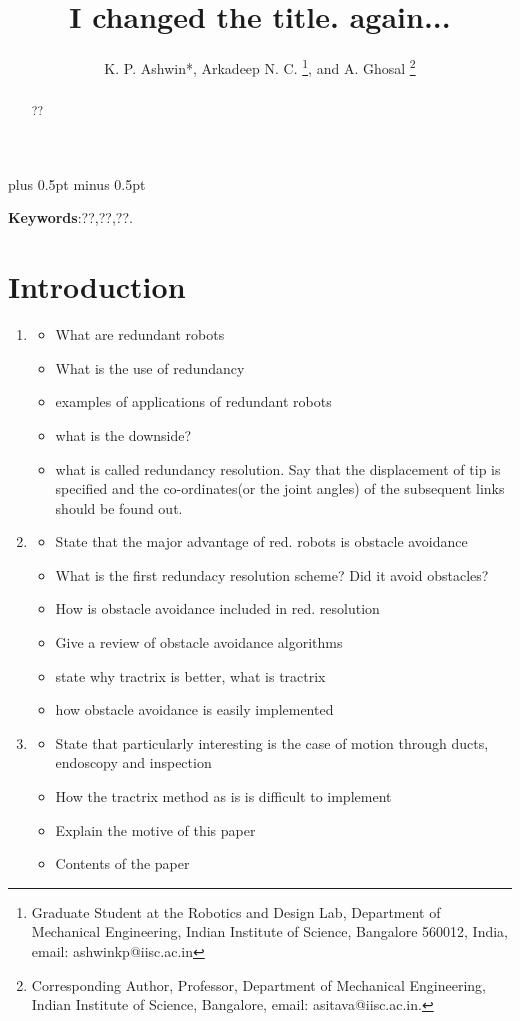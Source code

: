 \documentclass[11pt,a4paper]{article}
\begin{document}
%
\title{I changed the title. again... }
%
%
\author{K. P. Ashwin*, Arkadeep N. C.
\thanks{Graduate Student at the Robotics and Design Lab, Department
of Mechanical Engineering, Indian Institute of Science, Bangalore 560012, India, email: ashwinkp@iisc.ac.in}, 
 and A. Ghosal
\thanks{Corresponding Author, Professor, Department of Mechanical Engineering, Indian Institute of Science, Bangalore, email: asitava@iisc.ac.in.}}
%
\baselineskip 12pt plus 0.5pt minus 0.5pt 
%
\date{}
\maketitle
\begin{abstract}
\label{sec:abstract}
??
\end{abstract}

\textbf{Keywords}:??,??,??.
\linenumbers

\section{Introduction}
\label{sec:introduction}
\begin{enumerate}
\item
\begin{itemize}
\item What are redundant robots
\item What is the use of redundancy
\item examples of applications of redundant robots
\item what is the downside?
\item what is called redundancy resolution. Say that the displacement of tip is specified and the co-ordinates(or the joint angles) of the subsequent links should be found out.
\end{itemize}

\item
\begin{itemize}
\item State that the major advantage of red. robots is obstacle avoidance
\item What is the first redundacy resolution scheme? Did it avoid obstacles?
\item How is obstacle avoidance included in red. resolution
\item Give a review of obstacle avoidance algorithms
\item state why tractrix is better, what is tractrix
\item how obstacle avoidance is easily implemented
\end{itemize}

\item
\begin{itemize}
\item State that particularly interesting is the case of motion through ducts, endoscopy and inspection
\item How the tractrix method as is is difficult to implement
\item Explain the motive of this paper
\item Contents of the paper
\end{itemize}
\end{enumerate}
\end{document}
